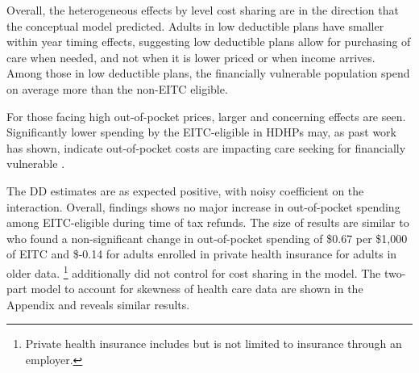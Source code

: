 \documentclass[smallcondensed,referee]{svjour3}
\begin{document}
Overall, the heterogeneous effects by level cost sharing are in the direction that the \cite{gross_liquidity_2020} conceptual model predicted. Adults in low deductible plans have smaller within year timing effects, suggesting low deductible plans allow for purchasing of care when needed, and not when it is lower priced or when income arrives. Among those in low deductible plans, the financially vulnerable population spend on average more than the non-EITC eligible. 

For those facing high out-of-pocket prices, larger and concerning effects are seen. Significantly lower spending by the EITC-eligible in HDHPs may, as past work has shown, indicate out-of-pocket costs are impacting care seeking for financially vulnerable \citep{haviland_how_2011}. 

The DD estimates are as expected  positive, with noisy coefficient on the interaction. Overall, findings shows no major increase in out-of-pocket spending among EITC-eligible during time of tax refunds. The size of results are similar to \cite{hamad_short-term_2019} who found a non-significant change in out-of-pocket spending of \$0.67 per \$1,000 of EITC and \$-0.14 for adults enrolled in private health insurance for adults in older data. \footnote{Private health insurance includes but is not limited to insurance through an employer.} \cite{hamad_short-term_2019} additionally did not control for cost sharing in the model. The two-part model to account for skewness of health care data are shown in the Appendix and reveals similar results.
\end{document}

